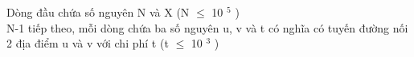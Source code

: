 Dòng đầu chứa số nguyên N và X (N  $\le$  10 $^ 5 $ )
\\N-1 tiếp theo, mỗi dòng chứa ba số nguyên u, v và t có nghĩa có tuyến đường nối 2 địa điểm u và v với chi phí t (t  $\le$  10 $^ 3 $ )
\\ 

\